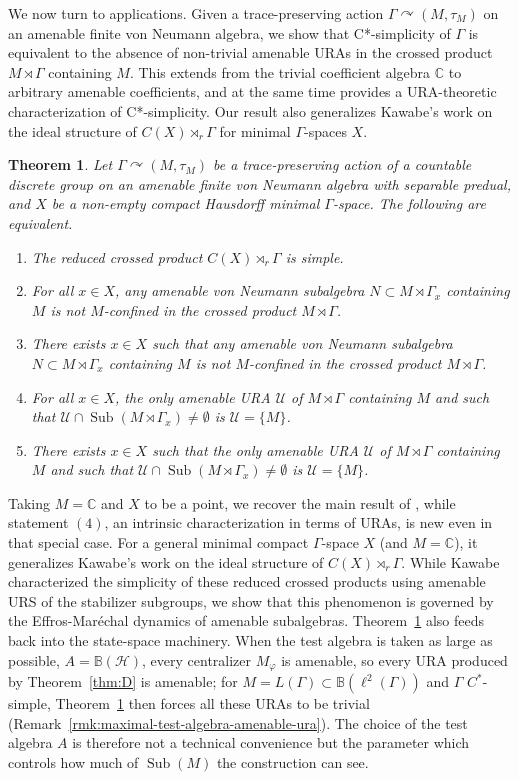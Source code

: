 \documentclass[12pt]{amsart} %
\theoremstyle{plain}
\newtheorem{theoremA}{Theorem}
\theoremstyle{definition}
\newcommand{\C}{\mathbb{C}}
\newcommand{\Ucal}{\mathcal{U}}
\DeclareMathOperator{\Sub}{Sub}
\begin{document}
We now turn to applications. Given a trace-preserving action $\Gamma \curvearrowright (M,\tau_M)$ on an amenable finite von Neumann algebra, we show that C*-simplicity of $\Gamma$ is equivalent to the absence of non-trivial amenable URAs in the crossed product $M \rtimes \Gamma$ containing $M$. This extends \cite{AJ} from the trivial coefficient algebra $\C$ to arbitrary amenable coefficients, and at the same time provides a URA-theoretic characterization of C*-simplicity. Our result also generalizes Kawabe's work \cite{kawabe2017uniformly} on the ideal structure of $C(X) \rtimes_r \Gamma$ for minimal $\Gamma$-spaces $X$.
\begin{theoremA}\label{thm:C}
Let $\Gamma \curvearrowright (M,\tau_M)$ be a trace-preserving action of a countable discrete group on an
amenable finite von Neumann algebra with separable predual, and  $X$ be a non-empty compact Hausdorff minimal $\Gamma$-space. The following are equivalent.
\begin{enumerate}
\item The reduced crossed product $C(X) \rtimes_r \Gamma$ is simple.
\item For all $x \in X$, any amenable von Neumann subalgebra $N\subset M\rtimes\Gamma_x$ containing $M$ is not $M$-confined in the crossed product $M\rtimes\Gamma$.
\item There exists $x \in X$ such that any amenable von Neumann subalgebra $N\subset M\rtimes\Gamma_x$ containing $M$ is not $M$-confined in the crossed product $M\rtimes\Gamma$.
\item For all $x\in X$, the only amenable URA $\Ucal$ of $M\rtimes\Gamma$ containing $M$ and such that $\Ucal\cap\Sub(M\rtimes\Gamma_x)\neq\emptyset$  is $\Ucal=\{M\}$.
\item There exists $x\in X$ such that the only amenable URA $\Ucal$ of $M\rtimes\Gamma$ containing $M$ and such that $\Ucal\cap\Sub(M\rtimes\Gamma_x)\neq\emptyset$  is $\Ucal=\{M\}$.
\end{enumerate}
\end{theoremA}
\noindent Taking $M = \C$ and $X$ to be a point, we recover the main result of \cite{AJ}, while statement $(4)$, an intrinsic characterization in terms of URAs, is new even in that special case. For a general minimal compact $\Gamma$-space $X$ (and $M=\C$), it generalizes Kawabe's work \cite{kawabe2017uniformly} on the ideal structure of $C(X) \rtimes_r \Gamma$. While Kawabe characterized the simplicity of these reduced crossed products using amenable URS of the stabilizer subgroups, we show that this phenomenon is governed by the Effros-Mar\'echal dynamics of amenable subalgebras. Theorem~\ref{thm:C} also feeds back into the state-space machinery. When the test algebra is taken as large as possible, $A=\mathbb B(\mathcal H)$, every centralizer $M_\varphi$ is amenable, so every URA produced by Theorem~\ref{thm:D} is amenable; for $M=L(\Gamma)\subset\mathbb B(\ell^2(\Gamma))$ and $\Gamma$ $C^*$-simple, Theorem~\ref{thm:C} then forces all these URAs to be trivial (Remark~\ref{rmk:maximal-test-algebra-amenable-ura}). The choice of the test algebra $A$ is therefore not a technical convenience but the parameter which controls how much of $\Sub(M)$ the construction can see.
\end{document}
